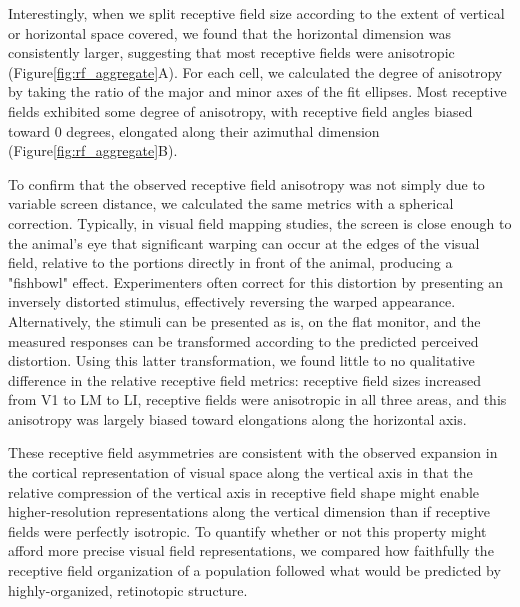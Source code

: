 Interestingly, when we split receptive field size according to the extent of vertical or horizontal space covered, we found that the horizontal dimension was consistently larger, suggesting that most receptive fields were anisotropic (Figure\ref{fig:rf_aggregate}A). For each cell, we calculated the degree of anisotropy by taking the ratio of the major and minor axes of the fit ellipses. Most receptive fields exhibited some degree of anisotropy, with receptive field angles biased toward 0 degrees, elongated along their azimuthal dimension (Figure\ref{fig:rf_aggregate}B). 

To confirm that the observed receptive field anisotropy was not simply due to variable screen distance, we calculated the same metrics with a spherical correction. Typically, in visual field mapping studies, the screen is close enough to the animal's eye that significant warping can occur at the edges of the visual field, relative to the portions directly in front of the animal, producing a "fishbowl" effect. Experimenters often correct for this distortion by presenting an inversely distorted stimulus, effectively reversing the warped appearance. Alternatively, the stimuli can be presented as is, on the flat monitor, and the measured responses can be transformed according to the predicted perceived distortion. Using this latter transformation, we found little to no qualitative difference in the relative receptive field metrics: receptive field sizes increased from V1 to LM to LI, receptive fields were anisotropic in all three areas, and this anisotropy was largely biased toward elongations along the horizontal axis.

These receptive field asymmetries are consistent with the observed expansion in the cortical representation of visual space along the vertical axis in that the relative compression of the vertical axis in receptive field shape might enable higher-resolution representations along the vertical dimension than if receptive fields were perfectly isotropic. To quantify whether or not this property might afford more precise visual field representations, we compared how faithfully the receptive field organization of a population followed what would be predicted by highly-organized, retinotopic structure. 

